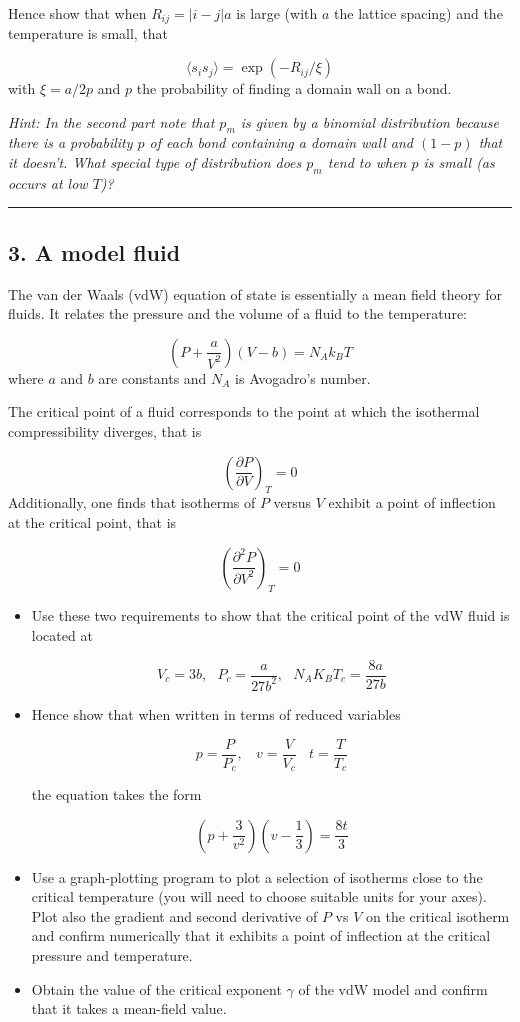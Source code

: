 \documentclass[
  letterpaper,
  enabledeprecatedfontcommands]{report}
\begin{document}
Hence show that when \(R_{ij}=|i-j|a\) is large (with \(a\) the lattice
spacing) and the temperature is small, that

\[\langle s_i s_j\rangle =\exp(-R_{ij}/\xi)\] with \(\xi=a/2p\) and
\(p\) the probability of finding a domain wall on a bond.

\emph{Hint: In the second part note that \(p_m\) is given by a binomial
distribution because there is a probability \(p\) of each bond
containing a domain wall and \((1-p)\) that it doesn't. What special
type of distribution does \(p_m\) tend to when \(p\) is small (as occurs
at low \(T\))?}

\begin{center}\rule{0.5\linewidth}{0.5pt}\end{center}

\subsection*{3. A model fluid}\label{a-model-fluid}

The van der Waals (vdW) equation of state is essentially a mean field
theory for fluids. It relates the pressure and the volume of a fluid to
the temperature:

\[\left(P+\frac{a}{V^2}\right)(V-b)=N_Ak_BT\] where \(a\) and \(b\) are
constants and \(N_A\) is Avogadro's number.

The critical point of a fluid corresponds to the point at which the
isothermal compressibility diverges, that is

\[\left(\frac{\partial P}{\partial V}\right)_T=0\] Additionally, one
finds that isotherms of \(P\) versus \(V\) exhibit a point of inflection
at the critical point, that is

\[\left(\frac{\partial^2 P}{\partial V^2}\right)_T=0\]

\begin{itemize}
\item
  Use these two requirements to show that the critical point of the vdW
  fluid is located at

  \[V_c=3b, ~~~ P_c=\frac{a}{27b^2},~~~ N_AK_BT_c=\frac{8a}{27b}\]
\item
  Hence show that when written in terms of reduced variables

  \[p=\frac{P}{P_c}, ~~~~ v=\frac{V}{V_c} ~~~~ t=\frac{T}{T_c}\]

  the equation takes the form

  \[\left(p+\frac{3}{v^2}\right)(v-\frac{1}{3})=\frac{8t}{3}\]
\item
  Use a graph-plotting program to plot a selection of isotherms close to
  the critical temperature (you will need to choose suitable units for
  your axes). Plot also the gradient and second derivative of \(P\) vs
  \(V\) on the critical isotherm and confirm numerically that it
  exhibits a point of inflection at the critical pressure and
  temperature.
\item
  Obtain the value of the critical exponent \(\gamma\) of the vdW model
  and confirm that it takes a mean-field value.
\end{itemize}
\end{document}
